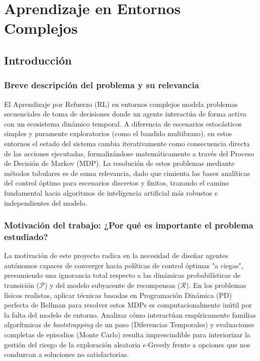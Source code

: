 \chapter{Aprendizaje en Entornos Complejos}

\section{Introducción}

\subsection{Breve descripción del problema y su relevancia}
El Aprendizaje por Refuerzo (RL) en entornos complejos modela problemas secuenciales de toma de decisiones donde un agente interactúa de forma activa con un ecosistema dinámico temporal. A diferencia de escenarios estocásticos simples y puramente exploratorios (como el bandido multibrazo), en estos entornos el estado del sistema cambia iterativamente como consecuencia directa de las acciones ejecutadas, formalizándose matemáticamente a través del Proceso de Decisión de Markov (MDP). La resolución de estos problemas mediante métodos tabulares es de suma relevancia, dado que cimienta las bases analíticas del control óptimo para escenarios discretos y finitos, trazando el camino fundamental hacia algoritmos de inteligencia artificial más robustos e independientes del modelo.

\subsection{Motivación del trabajo: ¿Por qué es importante el problema estudiado?}
La motivación de este proyecto radica en la necesidad de diseñar agentes autónomos capaces de converger hacia políticas de control óptimas "a ciegas", presumiendo una ignorancia total respecto a las dinámicas probabilísticas de transición ($\mathcal{P}$) y del modelo subyacente de recompensas ($\mathcal{R}$). En los problemas físicos realistas, aplicar técnicas basadas en Programación Dinámica (PD) perfecta de Bellman para resolver estos MDPs es computacionalmente inútil por la falta del modelo de entorno. Analizar cómo interactúan empíricamente familias algorítmicas de \textit{bootstrapping} de un paso (Diferencias Temporales) y evaluaciones completas de episodios (Monte Carlo) resulta imprescindible para interiorizar la gestión del riesgo de la exploración aleatoria $\epsilon$-Greedy frente a opciones que nos conduzcan a soluciones no satisfactorias.

